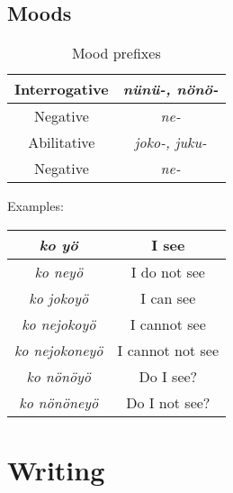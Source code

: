 \documentclass[a4paper]{article}
\begin{document}
\subsection{Moods}

\begin{table}[H]
\begin{tabular}{c | c}
Interrogative & \emph{n\"un\"u-, n\"on\"o-} \\
\hline
Negative & \emph{ne-} \\
\hline
Abilitative & \emph{joko-, juku-} \\
\hline
Negative & \emph{ne-}
\end{tabular}
\caption{Mood prefixes}
\end{table}

Examples:
\begin{table}[H]
\begin{tabular}{c | c}
\emph{ko y\"o} & I see \\
\hline
\emph{ko ney\"o} & I do not see \\
\hline
\emph{ko jokoy\"o} & I can see \\
\hline
\emph{ko nejokoy\"o} & I cannot see \\
\hline
\emph{ko nejokoney\"o} & I cannot not see \\
\hline
\emph{ko n\"on\"oy\"o} & Do I see? \\
\hline
\emph{ko n\"on\"oney\"o} & Do I not see?
\end{tabular}
\end{table}


\section{Writing}
\end{document}
